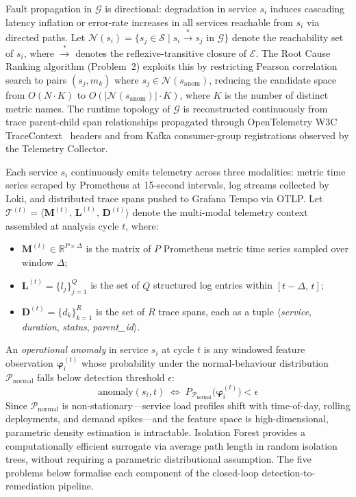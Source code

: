 \documentclass[a4paper,anonymous,UKenglish]{lipics-v2021}
\begin{document}
Fault propagation in $\mathcal{G}$ is directional: degradation in service
$s_i$ induces cascading latency inflation or error-rate increases in all
services reachable from $s_i$ via directed paths. Let
$\mathcal{N}(s_i) = \{s_j \in \mathcal{S} \mid s_i \xrightarrow{*} s_j
\text{ in } \mathcal{G}\}$ denote the reachability set of $s_i$, where
$\xrightarrow{*}$ denotes the reflexive-transitive closure of $\mathcal{E}$.
The Root Cause Ranking algorithm (Problem~2) exploits this by restricting
Pearson correlation search to pairs $(s_j, m_k)$ where
$s_j \in \mathcal{N}(s_{\text{anom}})$, reducing the candidate space from
$O(N \cdot K)$ to $O(|\mathcal{N}(s_{\text{anom}})| \cdot K)$, where $K$ is
the number of distinct metric names. The runtime topology of $\mathcal{G}$ is
reconstructed continuously from trace parent-child span relationships propagated
through OpenTelemetry W3C TraceContext~\cite{w3ctracecontext2021} headers and
from Kafka consumer-group registrations observed by the Telemetry Collector.

Each service $s_i$ continuously emits telemetry across three modalities:
metric time series scraped by Prometheus at 15-second intervals, log streams
collected by Loki, and distributed trace spans pushed to Grafana Tempo via
OTLP. Let $\mathcal{T}^{(t)} = \langle \mathbf{M}^{(t)},\, \mathbf{L}^{(t)},\,
\mathbf{D}^{(t)} \rangle$ denote the multi-modal telemetry context assembled at
analysis cycle $t$, where:
\begin{itemize}
    \item $\mathbf{M}^{(t)} \in \mathbb{R}^{P \times \Delta}$ is the matrix of
          $P$ Prometheus metric time series sampled over window $\Delta$;
    \item $\mathbf{L}^{(t)} = \{l_j\}_{j=1}^{Q}$ is the set of $Q$ structured
          log entries within $[t-\Delta,\, t]$;
    \item $\mathbf{D}^{(t)} = \{d_k\}_{k=1}^{R}$ is the set of $R$ trace spans,
          each as a tuple $\langle$\textit{service},
          \textit{duration}, \textit{status},
          \textit{parent\_id}$\rangle$.
\end{itemize}

An \textit{operational anomaly} in service $s_i$ at cycle $t$ is any windowed
feature observation $\boldsymbol{\varphi}_i^{(t)}$ whose probability under the
normal-behaviour distribution $\mathcal{P}_{\text{normal}}$ falls below
detection threshold $\epsilon$:
\begin{equation}
    \mathrm{anomaly}(s_i, t) \;\Leftrightarrow\;
    P_{\mathcal{P}_{\text{normal}}}\!\bigl(\boldsymbol{\varphi}_i^{(t)}\bigr) < \epsilon
    \label{eq:anomaly_def}
\end{equation}
Since $\mathcal{P}_{\text{normal}}$ is non-stationary---service load profiles
shift with time-of-day, rolling deployments, and demand spikes---and the
feature space is high-dimensional, parametric density estimation is intractable.
Isolation Forest provides a computationally efficient surrogate via average path
length in random isolation trees, without requiring a parametric distributional
assumption. The five problems below formalise each component of the closed-loop
detection-to-remediation pipeline.
\end{document}

